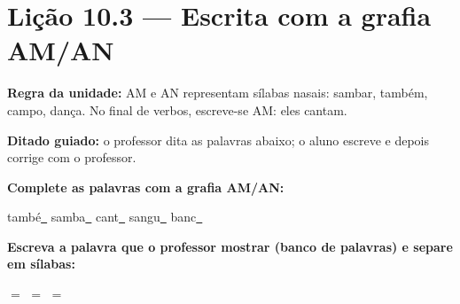 \section{Lição 10.3 --- Escrita com a grafia AM/AN}

\noindent\textbf{Regra da unidade:} AM e AN representam sílabas nasais: sambar, também, campo, dança. No final de verbos, escreve-se AM: eles cantam.


\noindent\textbf{Ditado guiado:} o professor dita as palavras abaixo; o aluno escreve e depois corrige com o professor.

\begin{center}
  \underline{\hspace{2.3cm}} \quad \underline{\hspace{2.3cm}} \quad \underline{\hspace{2.3cm}} \quad \underline{\hspace{2.3cm}}

  \underline{\hspace{2.3cm}} \quad \underline{\hspace{2.3cm}} \quad \underline{\hspace{2.3cm}} \quad \underline{\hspace{2.3cm}}
\end{center}

\noindent\textbf{Complete as palavras com a grafia AM/AN:}
\begin{center}
  també\underline{~} \quad samba\underline{~} \quad cant\underline{~} \quad sangu\underline{~} \quad banc\underline{~}
\end{center}

\noindent\textbf{Escreva a palavra que o professor mostrar (banco de palavras) e separe em sílabas:}

\begin{center}
  \underline{\hspace{2cm}} $=$ \underline{\hspace{2cm}} \quad \underline{\hspace{2cm}} $=$ \underline{\hspace{2cm}} \quad \underline{\hspace{2cm}} $=$ \underline{\hspace{2cm}}
  \end{center}



